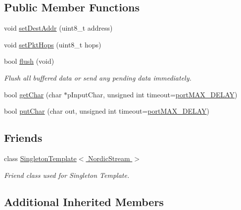 \subsection*{Public Member Functions}
\begin{DoxyCompactItemize}
\item 
void \hyperlink{classNordicStream_aec819a09eab2ff62be9d520e8064f429}{set\+Dest\+Addr} (uint8\+\_\+t address)
\item 
void \hyperlink{classNordicStream_a0b49097330410ef00621e3d2befe06a1}{set\+Pkt\+Hops} (uint8\+\_\+t hops)
\item 
bool \hyperlink{classNordicStream_a95c0c66acbcdf33894fc2cfacfbe5419}{flush} (void)
\begin{DoxyCompactList}\small\item\em Flush all buffered data or send any pending data immediately. \end{DoxyCompactList}\end{DoxyCompactItemize}
{\bf }\par
\begin{DoxyCompactItemize}
\item 
bool \hyperlink{classNordicStream_a8cf184554a505c922c57352ba571765b}{get\+Char} (char $\ast$p\+Input\+Char, unsigned int timeout=\hyperlink{portmacro_8h_a72723ba1e4a85ca14f25c2b9e066613d}{port\+M\+A\+X\+\_\+\+D\+E\+L\+AY})
\item 
bool \hyperlink{classNordicStream_aefb871567b4712b2bf52caa656dc1d2a}{put\+Char} (char out, unsigned int timeout=\hyperlink{portmacro_8h_a72723ba1e4a85ca14f25c2b9e066613d}{port\+M\+A\+X\+\_\+\+D\+E\+L\+AY})
\end{DoxyCompactItemize}

\subsection*{Friends}
\begin{DoxyCompactItemize}
\item 
class \hyperlink{classNordicStream_ab4472738cb423383808e311cf4677007}{Singleton\+Template$<$ Nordic\+Stream $>$}
\begin{DoxyCompactList}\small\item\em Friend class used for Singleton Template. \end{DoxyCompactList}\end{DoxyCompactItemize}
\subsection*{Additional Inherited Members}


